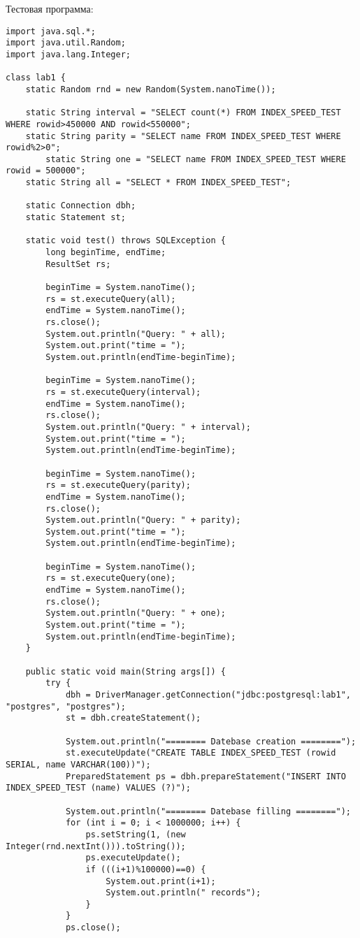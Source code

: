 \documentclass[a4paper,12pt]{article}
\begin{document}
Тестовая программа:
\begin{lstlisting}
import java.sql.*;
import java.util.Random;
import java.lang.Integer;

class lab1 {
	static Random rnd = new Random(System.nanoTime());

	static String interval = "SELECT count(*) FROM INDEX_SPEED_TEST WHERE rowid>450000 AND rowid<550000";
	static String parity = "SELECT name FROM INDEX_SPEED_TEST WHERE rowid%2>0";
        static String one = "SELECT name FROM INDEX_SPEED_TEST WHERE rowid = 500000";
	static String all = "SELECT * FROM INDEX_SPEED_TEST";

	static Connection dbh;
	static Statement st;

	static void test() throws SQLException {
		long beginTime, endTime;
		ResultSet rs;

		beginTime = System.nanoTime();
		rs = st.executeQuery(all);
		endTime = System.nanoTime();
		rs.close();
		System.out.println("Query: " + all);
		System.out.print("time = ");
		System.out.println(endTime-beginTime);

		beginTime = System.nanoTime();
		rs = st.executeQuery(interval);
		endTime = System.nanoTime();
		rs.close();
		System.out.println("Query: " + interval);
		System.out.print("time = ");
		System.out.println(endTime-beginTime);

		beginTime = System.nanoTime();
		rs = st.executeQuery(parity);
		endTime = System.nanoTime();
		rs.close();
		System.out.println("Query: " + parity);
		System.out.print("time = ");
		System.out.println(endTime-beginTime);

		beginTime = System.nanoTime();
		rs = st.executeQuery(one);
		endTime = System.nanoTime();
		rs.close();
		System.out.println("Query: " + one);
		System.out.print("time = ");
		System.out.println(endTime-beginTime);
	}

	public static void main(String args[]) {
		try {
			dbh = DriverManager.getConnection("jdbc:postgresql:lab1", "postgres", "postgres");
			st = dbh.createStatement();

			System.out.println("======== Datebase creation ========");
			st.executeUpdate("CREATE TABLE INDEX_SPEED_TEST (rowid SERIAL, name VARCHAR(100))");
			PreparedStatement ps = dbh.prepareStatement("INSERT INTO INDEX_SPEED_TEST (name) VALUES (?)");

			System.out.println("======== Datebase filling ========");
			for (int i = 0; i < 1000000; i++) {
				ps.setString(1, (new Integer(rnd.nextInt())).toString());
				ps.executeUpdate();
				if (((i+1)%100000)==0) {
					System.out.print(i+1);
					System.out.println(" records");
				}
			}
			ps.close();


\end{lstlisting}
\end{document}
